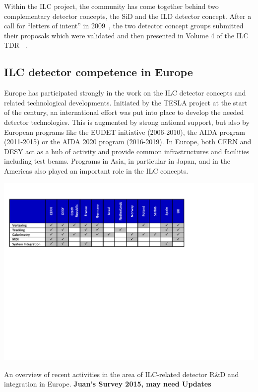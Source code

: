 \documentclass[%
 reprint,
 amsmath,amssymb,
 aps,
]{revtex4-1}
\begin{document}
Within the ILC project, the community has come together behind two complementary detector concepts, the SiD and the ILD detector concept. After a call for ``letters of intent'' in 2009~\cite{Aihara:2009ad,Abe:2010aa}, the two detector concept groups submitted their proposals which were validated and then presented in Volume 4 of the ILC TDR ~\cite{Behnke:2013lya}.

\subsection{ILC detector competence in Europe~\label{sec:det:competence}}
Europe has participated strongly in the work on the ILC detector concepts and related technological developments. Initiated by the TESLA project at the start of the century, an international effort was put into place to develop the needed detector technologies. This is augmented by strong national support, but also by European programs like the EUDET initiative (2006-2010), the AIDA program (2011-2015) or the AIDA 2020 program (2016-2019). In Europe, both CERN and DESY act as a hub of activity and provide common infrastructures and facilities including test beams. Programs in Asia, in particular in Japan, and in the Americas also played an important role in the ILC concepts. 

\begin{table}[t]
\includegraphics[width=\hsize]{figures/ILCEAP-Matrices-detectors.pdf}
\caption{\label{tab:PrePrep:detectors} An overview of recent activities in the area of ILC-related detector R\&D and integration in Europe. \bfseries{Juan's Survey 2015, may need Updates}}
\end{table}
\end{document}
